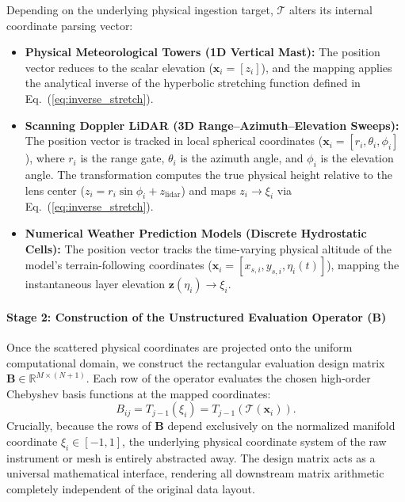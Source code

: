 \documentclass[11pt,a4paper]{article}
\begin{document}
Depending on the underlying physical ingestion target, $\mathcal{T}$ alters its internal coordinate parsing vector:
\begin{itemize}
\item \textbf{Physical Meteorological Towers (1D Vertical Mast):} The position vector reduces to the scalar elevation ($\mathbf{x}_i = [z_i]$), and the mapping applies the analytical inverse of the hyperbolic stretching function defined in Eq.~(\ref{eq:inverse_stretch}).
\item \textbf{Scanning Doppler LiDAR (3D Range--Azimuth--Elevation Sweeps):} The position vector is tracked in local spherical coordinates ($\mathbf{x}_i = [r_i, \theta_i, \phi_i]$), where $r_i$ is the range gate, $\theta_i$ is the azimuth angle, and $\phi_i$ is the elevation angle. The transformation computes the true physical height relative to the lens center ($z_i = r_i \sin \phi_i + z_{\mathrm{lidar}}$) and maps $z_i \rightarrow \xi_i$ via Eq.~(\ref{eq:inverse_stretch}).
\item \textbf{Numerical Weather Prediction Models (Discrete Hydrostatic Cells):} The position vector tracks the time-varying physical altitude of the model's terrain-following coordinates ($\mathbf{x}_i = [x_{s,i}, y_{s,i}, \eta_i(t)]$), mapping the instantaneous layer elevation $\mathbf{z}(\eta_i) \rightarrow \xi_i$.
\end{itemize}

\paragraph{Stage 2: Construction of the Unstructured Evaluation Operator ($\mathbf{B}$)}
Once the scattered physical coordinates are projected onto the uniform computational domain, we construct the rectangular evaluation design matrix $\mathbf{B} \in \mathbb{R}^{M \times (N+1)}$. Each row of the operator evaluates the chosen high-order Chebyshev basis functions at the mapped coordinates:
\begin{equation}
B_{ij} = T_{j-1}(\xi_i) = T_{j-1}\left(\mathcal{T}(\mathbf{x}_i)\right).
\label{eq:b_matrix_unstructured}
\end{equation}
Crucially, because the rows of $\mathbf{B}$ depend exclusively on the normalized manifold coordinate $\xi_i \in [-1, 1]$, the underlying physical coordinate system of the raw instrument or mesh is entirely abstracted away. The design matrix acts as a universal mathematical interface, rendering all downstream matrix arithmetic completely independent of the original data layout.
\end{document}
